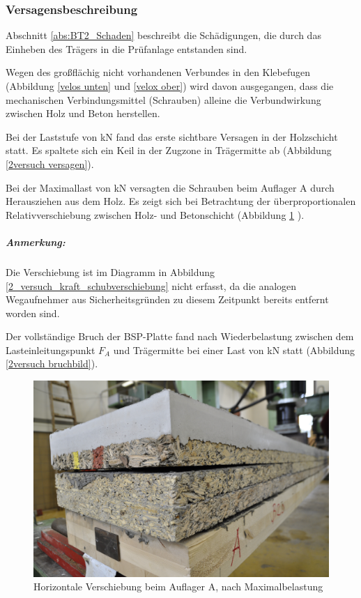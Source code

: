 \subsubsection{Versagensbeschreibung}

Abschnitt \ref{abs:BT2_Schaden} beschreibt die Schädigungen, die durch das Einheben des Trägers in die Prüfanlage entstanden sind.  

Wegen des großflächig nicht vorhandenen Verbundes in den Klebefugen (Abbildung \ref{velos unten} und \ref{velox ober}) wird davon ausgegangen, dass die mechanischen Verbindungsmittel (Schrauben) alleine die Verbundwirkung zwischen Holz und Beton herstellen. 

Bei der Laststufe von \unit[24]{kN} fand das erste sichtbare Versagen in der Holzschicht statt. Es spaltete sich ein Keil in der Zugzone in Trägermitte ab (Abbildung \ref{2versuch versagen}).

Bei der Maximallast von \unit[31]{kN} versagten die Schrauben beim Auflager A durch Herausziehen aus 
dem Holz. Es zeigt sich bei Betrachtung der überproportionalen Relativverschiebung zwischen Holz- und Betonschicht (Abbildung \ref{BT2_Verschiebung_AuflagerA} ). 
\subparagraph{Anmerkung:} Die Verschiebung ist im Diagramm in Abbildung \ref{2_versuch_kraft_schubverschiebung} nicht erfasst, da die analogen Wegaufnehmer aus Sicherheitsgründen zu diesem Zeitpunkt bereits entfernt worden sind. 

Der vollständige Bruch der BSP-Platte fand  nach Wiederbelastung zwischen dem Lasteinleitungspunkt $F_{A}$ und Trägermitte bei einer Last von \unit[21]{kN} statt (Abbildung \ref{2versuch bruchbild}).




\begin{figure}
\begin{center}
\includegraphics[scale =0.1]{Auswertung/2versuch/BT2_Verschiebung_AuflagerA.jpg}
\caption{Horizontale Verschiebung beim Auflager A, nach Maximalbelastung}
\label{BT2_Verschiebung_AuflagerA}
\end{center}
\end{figure}



